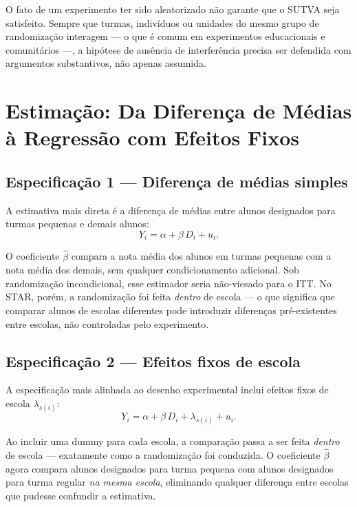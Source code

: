 \begin{atencaobox}
O fato de um experimento ter sido aleatorizado não garante que o SUTVA seja satisfeito. Sempre que turmas, indivíduos ou unidades do mesmo grupo de randomização interagem --- o que é comum em experimentos educacionais e comunitários ---, a hipótese de ausência de interferência precisa ser defendida com argumentos substantivos, não apenas assumida.
\end{atencaobox}


\section{Estimação: Da Diferença de Médias à Regressão com Efeitos Fixos}
\label{sec:star_estimacao}

\subsection*{Especificação 1 — Diferença de médias simples}

A estimativa mais direta é a diferença de médias entre alunos designados para turmas pequenas e demais alunos:
\begin{equation}
  Y_i = \alpha + \beta\, D_i + u_i.
  \label{eq:spec1}
\end{equation}

O coeficiente $\hat{\beta}$ compara a nota média dos alunos em turmas pequenas com a nota média dos demais, sem qualquer condicionamento adicional. Sob randomização incondicional, esse estimador seria não-viesado para o ITT. No STAR, porém, a randomização foi feita \textit{dentro} de escola --- o que significa que comparar alunos de escolas diferentes pode introduzir diferenças pré-existentes entre escolas, não controladas pelo experimento.

\subsection*{Especificação 2 — Efeitos fixos de escola}

A especificação mais alinhada ao desenho experimental inclui efeitos fixos de escola $\lambda_{s(i)}$:
\begin{equation}
  Y_i = \alpha + \beta\, D_i + \lambda_{s(i)} + u_i.
  \label{eq:spec2}
\end{equation}

Ao incluir uma dummy para cada escola, a comparação passa a ser feita \textit{dentro} de escola --- exatamente como a randomização foi conduzida. O coeficiente $\hat{\beta}$ agora compara alunos designados para turma pequena com alunos designados para turma regular \textit{na mesma escola}, eliminando qualquer diferença entre escolas que pudesse confundir a estimativa.

